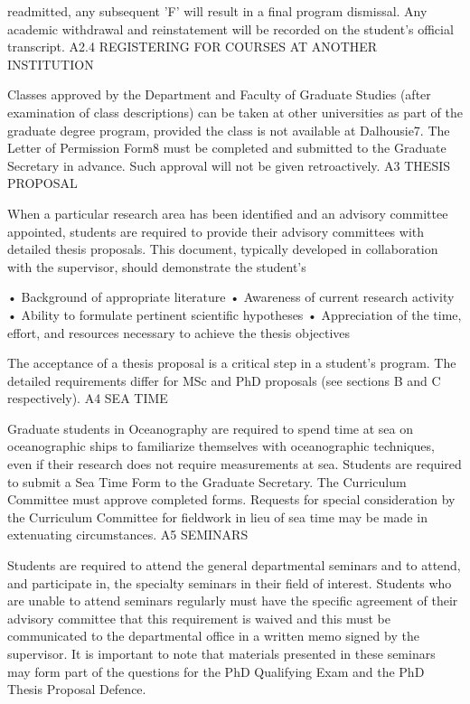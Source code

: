 \documentclass{article}
\begin{document}
readmitted, any subsequent 'F' will result in a final program dismissal. Any academic withdrawal and reinstatement will be recorded on the student's official transcript.
A2.4	REGISTERING FOR COURSES AT ANOTHER INSTITUTION

Classes approved by the Department and Faculty of Graduate Studies (after examination of class descriptions) can be taken at other universities as part of the graduate degree program, provided the class is not available at Dalhousie7.
The Letter of Permission Form8 must be completed and submitted to the Graduate Secretary in advance. Such approval will not be given retroactively.
A3	THESIS PROPOSAL

When a particular research area has been identified and an advisory committee appointed, students are required to provide their advisory committees with detailed thesis proposals. This document, typically developed in collaboration with the supervisor, should demonstrate the student's

•	Background of appropriate literature
•	Awareness of current research activity
•	Ability to formulate pertinent scientific hypotheses
•	Appreciation of the time, effort, and resources necessary to achieve the thesis objectives

The acceptance of a thesis proposal is a critical step in a student's program. The detailed requirements differ for MSc and PhD proposals (see sections B and C respectively).
A4	SEA TIME

Graduate students in Oceanography are required to spend time at sea on oceanographic ships to familiarize themselves with oceanographic techniques, even if their research does not require measurements at sea. Students are required to submit a Sea Time Form to the Graduate Secretary. The Curriculum Committee must approve completed forms. Requests for special consideration by the Curriculum Committee for fieldwork in lieu of sea time may be made in extenuating circumstances.
A5	SEMINARS

Students are required to attend the general departmental seminars and to attend, and participate in, the specialty seminars in their field of interest. Students who are unable to attend seminars regularly must have the specific agreement of their advisory committee that this requirement is waived and this must be communicated to the departmental office in a written memo signed by the supervisor. It is important to note that materials presented in these seminars may form part of the questions for the PhD Qualifying Exam and the PhD Thesis Proposal Defence.
\end{document}
